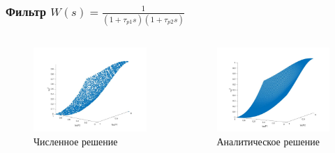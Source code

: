\documentclass{beamer}
\begin{document}
\begin{frame}
\frametitle{Фильтр $W(s) = \frac{1}{(1+\tau_{p1}s)(1+\tau_{p2}s)}$}
\begin{columns}[onlytextwidth]
\begin{column}{.5\textwidth}
\begin{figure}
  \includegraphics[width=\textwidth]{images/filter1e.jpg}
  \caption{Численное решение}
\end{figure}
\end{column}
\hfill
\begin{column}{.5\textwidth}
\begin{figure}
  \includegraphics[width=\textwidth]{images/filter1_1.jpg}
  \caption{Аналитическое решение}
\end{figure}
\end{column}
\end{columns}
\end{frame}
\end{document}

